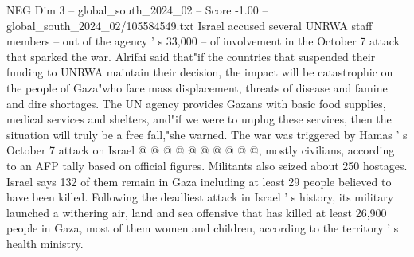 \begin{textsample}{NEG Dim 3 – global\_south\_2024\_02 – Score -1.00 – global\_south\_2024\_02/105584549.txt}
Israel accused several UNRWA staff members -- out of the agency ' s 33,000 -- of involvement in the October 7 attack that sparked the war.
Alrifai said that"if the countries that suspended their funding to UNRWA maintain their decision, the impact will be catastrophic on the people of Gaza"who face mass displacement, threats of disease and famine and dire shortages.
The UN agency provides Gazans with basic food supplies, medical services and shelters, and"if we were to unplug these services, then the situation will truly be a free fall,"she warned.
The war was triggered by Hamas ' s October 7 attack on Israel @ @ @ @ @ @ @ @ @ @, mostly civilians, according to an AFP tally based on official figures.
Militants also seized about 250 hostages.
Israel says 132 of them remain in Gaza including at least 29 people believed to have been killed.
Following the deadliest attack in Israel ' s history, its military launched a withering air, land and sea offensive that has killed at least 26,900 people in Gaza, most of them women and children, according to the territory ' s health ministry.

\end{textsample}
